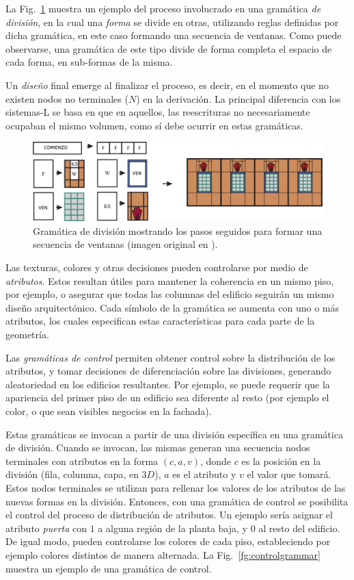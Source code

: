 La Fig.~\ref{fg:splitgrammar} muestra un ejemplo del proceso involucrado en una gramática {\em de división}, en la cual una {\em forma} se divide en otras, utilizando reglas definidas por dicha gramática, en este caso formando una secuencia de ventanas.
Como puede observarse, una gramática de este tipo divide de forma completa el espacio de cada forma, en sub-formas de la misma.

Un {\em diseño} final emerge al finalizar el proceso, es decir, en el momento que no existen nodos no terminales ($N$) en la derivación.
La principal diferencia con los sistemas-L se basa en que en aquellos, las reescrituras no necesariamente ocupaban el mismo volumen, como sí debe ocurrir en estas gramáticas.

\begin{figure}
\center
\includegraphics[width=13cm]{figures/splitgrammar}
\caption[Gramática para formar una secuencia de ventanas]{Gramática de división mostrando los pasos seguidos para formar una secuencia de ventanas (imagen original en \cite{Wonka2003}).}
\label{fg:splitgrammar}
\end{figure}

Las texturas, colores y otras decisiones pueden controlarse por medio de {\em atributos}.
Estos resultan útiles para mantener la coherencia en un mismo piso, por ejemplo, o asegurar que todas las columnas del edificio seguirán un mismo diseño arquitectónico.
Cada símbolo de la gramática se aumenta con uno o más atributos, los cuales especifican estas características para cada parte de la geometría.


Las {\em gramáticas de control} permiten obtener control sobre la distribución de los atributos, y tomar decisiones de diferenciación sobre las divisiones, generando aleatoriedad en los edificios resultantes.
Por ejemplo, se puede requerir que la apariencia del primer piso de un edificio sea diferente al resto (por ejemplo el color, o que sean visibles negocios en la fachada).

Estas gramáticas se invocan a partir de una división específica en una gramática de división.
Cuando se invocan, las mismas generan una secuencia nodos terminales con atributos en la forma $(c,a,v)$, donde $c$ es la posición en la división (fila, columna, capa, en $3D$), $a$ es el atributo y $v$ el valor que tomará.
Estos nodos terminales se utilizan para rellenar los valores de los atributos de las nuevas formas en la división.
Entonces, con una gramática de control se posibilita el control del proceso de distribución de atributos.
Un ejemplo sería asignar el atributo {\em puerta} con $1$ a alguna región de la planta baja, y $0$ al resto del edificio.
De igual modo, pueden controlarse los colores de cada piso, estableciendo por ejemplo colores distintos de manera alternada.
La Fig.~\ref{fg:controlgrammar} muestra un ejemplo de una gramática de control.


